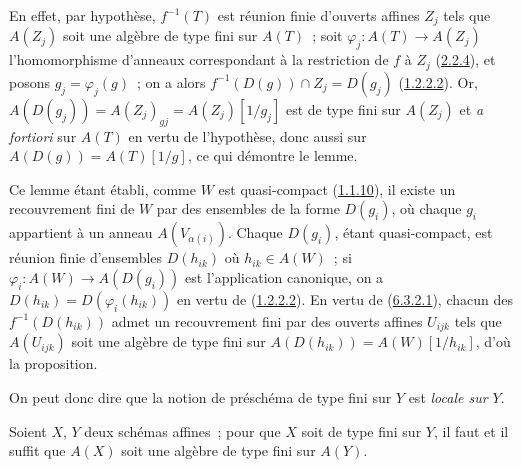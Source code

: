 En effet, par hypothèse, $f^{-1}(T)$ est réunion finie d'ouverts affines
$Z_j$ tels que $A(Z_j)$ soit une algèbre de type fini sur $A(T)$~; soit
$\varphi_j:A(T)\to A(Z_j)$ l'homomorphisme d'anneaux correspondant à la
restriction de $f$ à $Z_j$ (\hyperref[I.2.2.4-fr]{2.2.4}), et posons
$g_j=\varphi_j(g)$~; on a alors
$f^{-1}(D(g))\cap Z_j=D(g_j)$
(\hyperref[I.1.2.2.2-fr]{1.2.2.2}). Or,
$A(D(g_j))=A(Z_j)_{gj}=A(Z_j)[1/g_j]$ est de type fini sur $A(Z_j)$ et
\emph{a fortiori} sur $A(T)$ en vertu de l'hypothèse, donc aussi sur
$A(D(g))=A(T)[1/g]$, ce qui démontre le lemme.

Ce lemme étant établi, comme $W$ est quasi-compact
(\hyperref[I.1.1.10-fr]{1.1.10}), il existe un recouvrement fini de $W$ par
des ensembles de la forme $D(g_i)$, où chaque $g_i$ appartient à un anneau
$A(V_{\alpha(i)})$. Chaque $D(g_i)$, étant quasi-compact, est réunion finie
d'ensembles $D(h_{ik})$ où $h_{ik}\in A(W)$~; si
$\varphi_i:A(W)\to A(D(g_i))$ est l'application canonique, on a
$D(h_{ik})=D(\varphi_i(h_{ik}))$ en vertu de
(\hyperref[I.1.2.2.2-fr]{1.2.2.2}). En vertu de
(\hyperref[I.6.3.2.1-fr]{6.3.2.1}), chacun des
$f^{-1}(D(h_{ik}))$ admet un recouvrement fini par des ouverts affines
$U_{ijk}$ tels que $A(U_{ijk})$ soit une algèbre de type fini sur
$A(D(h_{ik}))=A(W)[1/h_{ik}]$, d'où la proposition.

On peut donc dire que la notion de préschéma de type fini sur $Y$ est
\emph{locale sur $Y$}.

\begin{proposition}[6.3.3]
\label{I.6.3.3-fr}
Soient $X$, $Y$ deux schémas affines~; pour que $X$ soit de type fini sur
$Y$, il faut et il suffit que $A(X)$ soit une algèbre de type fini sur
$A(Y)$.
\end{proposition}

